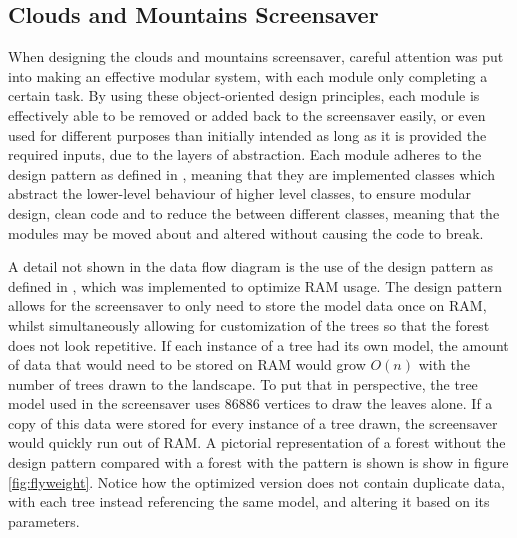 \documentclass[10pt, openany]{book}
\begin{document}
\subsection{Clouds and Mountains Screensaver}
When designing the clouds and mountains screensaver, careful attention was put into making an effective modular system, with each module only completing a certain task. By using these object-oriented design principles, each module is effectively able to be removed or added back to the screensaver easily, or even used for different purposes than initially intended as long as it is provided the required inputs, due to the layers of abstraction. Each module adheres to the \textit{} design pattern as defined in \citep{nystrom2014game}, meaning that they are implemented classes which abstract the lower-level behaviour of higher level classes, to ensure modular design, clean code and to reduce the  between different classes, meaning that the modules may be moved about and altered without causing the code to break. 

A detail not shown in the data flow diagram is the use of the \textit{} design pattern as defined in \citep{gamma1995design}, which was implemented to optimize RAM usage. The \textit{} design pattern allows for the screensaver to only need to store the model data once on RAM, whilst simultaneously allowing for customization of the trees so that the forest does not look repetitive. If each instance of a tree had its own model, the amount of data that would need to be stored on RAM would grow $O(n)$ with the number of trees drawn to the landscape. To put that in perspective, the tree model used in the screensaver uses 86886 vertices to draw the leaves alone. If a copy of this data were stored for every instance of a tree drawn, the screensaver would quickly run out of RAM. A pictorial representation of a forest without the \textit{} design pattern compared with a forest with the pattern is shown is show in figure \ref{fig:flyweight}. Notice how the optimized version does not contain duplicate data, with each tree instead referencing the same model, and altering it based on its parameters.
\end{document}

